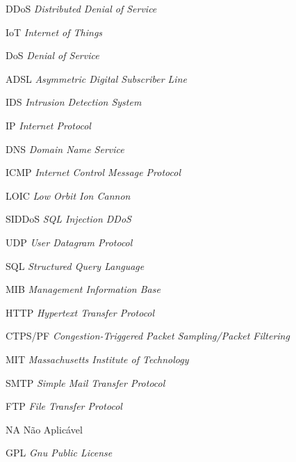 \begin{siglas}\setlength{\labelwidth}{15ex} \setlength{\itemsep}{0.0001\baselineskip}
  \item[DDoS] \textit{Distributed Denial of Service} 
  \item[IoT] \textit{Internet of Things}
  \item[DoS] \textit{Denial of Service}
  \item [ADSL] \textit{Asymmetric Digital Subscriber Line}
  \item[IDS] \textit{Intrusion Detection System}
  \item[IP] \textit{Internet Protocol}
  \item[DNS] \textit{Domain Name Service}
  \item[ICMP] \textit{Internet Control Message Protocol}
  \item[LOIC] \textit{Low Orbit Ion Cannon}
  \item[SIDDoS] \textit{SQL Injection DDoS}
  \item[UDP] \textit{User Datagram Protocol}
  \item[SQL] \textit{Structured Query Language}
  \item[MIB] \textit{Management Information Base}
  \item[HTTP] \textit{Hypertext Transfer Protocol}
  \item[CTPS/PF] \textit{Congestion-Triggered Packet Sampling/Packet Filtering}	  
  \item[MIT] \textit{Massachusetts Institute of Technology}
  \item[SMTP] \textit{Simple Mail Transfer Protocol}
  \item[FTP] \textit{File Transfer Protocol}
  \item[NA] Não Aplicável
  \item[GPL] \textit{Gnu Public License}
  
  
   
\end{siglas}
